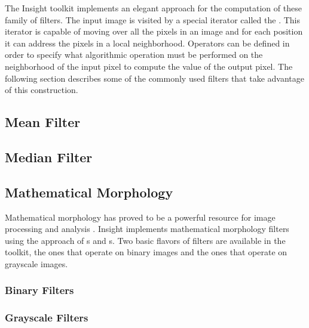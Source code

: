The Insight toolkit implements an elegant approach for the computation of these
family of filters. The input image is visited by a special iterator called the
. This iterator is capable of moving over all
the pixels in an image and for each position it can address the pixels in a
local neighborhood. Operators can be defined in order to specify what
algorithmic operation must be performed on the neighborhood of the input pixel
to compute the value of the output pixel. The following section describes some
of the commonly used filters that take advantage of this construction.  

\subsection{Mean Filter}
\label{sec:MeanFilter}



\subsection{Median Filter}
\label{sec:MedianFilter}




\subsection{Mathematical Morphology}
\label{sec:MathematicalMorphology}

Mathematical morphology has proved to be a powerful resource for image
processing and analysis \cite{Serra1982}. Insight implements mathematical
morphology filters using the approach of s and
s. Two basic flavors of filters are available in the
toolkit, the ones that operate on binary images and the ones that operate on
grayscale images. 

\subsubsection{Binary Filters}
\label{sec:MathematicalMorphologyBinaryFilters}




\subsubsection{Grayscale Filters}
\label{sec:MathematicalMorphologyGrayscaleFilters}

